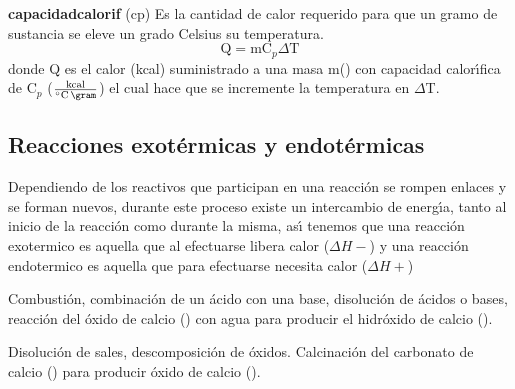 \noindent\textbf{\gls{capacidadcalorif}} (\gls{cp}) Es la cantidad de calor requerido para que un gramo de sustancia se eleve  un grado Celsius su temperatura.
\begin{equation}
\textrm{Q} =\textrm{m} \textrm{C}_p \Delta \textrm{T}
\end{equation}
 donde
Q es el calor  (kcal) suministrado a una masa m(\gram) con capacidad calor\'{\i}fica de C$_p$ ($\frac{\textrm{kcal}}{^\circ \textrm{C}\,\gram}$) el cual hace que se incremente la temperatura en $\Delta$T.

\subsection{Reacciones exot\'ermicas y endot\'ermicas}

Dependiendo de los reactivos que participan en una reacci\'on se rompen enlaces y se forman nuevos, durante este proceso existe un intercambio de energ\'{\i}a, tanto al inicio de la reacci\'on como durante la misma, as\'{\i} tenemos que una reacci\'on \gls{exotermico} es aquella que al efectuarse libera calor ($\Delta H -$)
 y una reacci\'on \gls{endotermico} es aquella que para efectuarse necesita calor ($\Delta H +$) 

\begin{example} 
Combusti\'on, combinaci\'on de un \'acido con una base, disoluci\'on de \'acidos o bases, reacci\'on del \'oxido de calcio () con agua para producir el hidr\'oxido de calcio ().
\end{example}
\begin{example}
 Disoluci\'on de sales, descomposici\'on de \'oxidos. Calcinaci\'on del carbonato de calcio () para producir \'oxido de calcio ().
\end{example}

